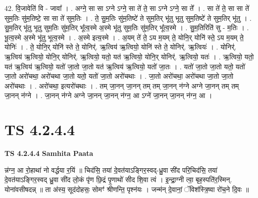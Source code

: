 \documentclass[17pt]{extarticle}
\begin{document}
42. वि॒जावेति॑ वि - जावा᳚ । . अग्ने॒ सा सा ऽग्ने ऽग्ने॒ सा ते॑ ते॒ सा ऽग्ने ऽग्ने॒ सा ते᳚ । . सा ते॑ ते॒ सा सा ते॑ सुम॒तिः सु॑म॒तिष्टे॒ सा सा ते॑ सुम॒तिः । . ते॒ सु॒म॒तिः सु॑म॒तिष्टे॑ ते सुम॒तिर् भू॑तु भूतु सुम॒तिष्टे॑ ते सुम॒तिर् भू॑तु । . सु॒म॒तिर् भू॑तु भूतु सुम॒तिः सु॑म॒तिर् भू᳚त्व॒स्मे अ॒स्मे भू॑तु सुम॒तिः सु॑म॒तिर् भू᳚त्व॒स्मे । . सु॒म॒तिरिति॑ सु - म॒तिः । . भू॒त्व॒स्मे अ॒स्मे भू॑तु भूत्व॒स्मे । . अ॒स्मे इत्य॒स्मे । . अ॒यम् ते॑ ते॒ ऽय म॒यम् ते॒ योनि॒र् योनि॑ स्ते॒ ऽय म॒यम् ते॒ योनिः॑ । . ते॒ योनि॒र् योनि॑ स्ते ते॒ योनिर्॑. ऋ॒त्विय॑ ऋ॒त्वियो॒ योनि॑ स्ते ते॒ योनिर्॑. ऋ॒त्वियः॑ । . योनिर्॑. ऋ॒त्विय॑ ऋ॒त्वियो॒ योनि॒र् योनिर्॑. ऋ॒त्वियो॒ यतो॒ यत॑ ऋ॒त्वियो॒ योनि॒र् योनिर्॑. ऋ॒त्वियो॒ यतः॑ । . ऋ॒त्वियो॒ यतो॒ यत॑ ऋ॒त्विय॑ ऋ॒त्वियो॒ यतो॑ जा॒तो जा॒तो यत॑ ऋ॒त्विय॑ ऋ॒त्वियो॒ यतो॑ जा॒तः । . यतो॑ जा॒तो जा॒तो यतो॒ यतो॑ जा॒तो अरो॑चथा॒ अरो॑चथा जा॒तो यतो॒ यतो॑ जा॒तो अरो॑चथाः । . जा॒तो अरो॑चथा॒ अरो॑चथा जा॒तो जा॒तो अरो॑चथाः । . अरो॑चथा॒ इत्यरो॑चथाः । . तम् जा॒नन् जा॒नन् तम् तम् जा॒नन् न॑ग्ने अग्ने जा॒नन् तम् तम् जा॒नन् न॑ग्ने । . जा॒नन् न॑ग्ने अग्ने जा॒नन् जा॒नन् न॑ग्न॒ आ ऽग्ने॑ जा॒नन् जा॒नन् न॑ग्न॒ आ । \newline
\pagebreak
{}

\section{ TS 4.2.4.4 }

\textbf{TS 4.2.4.4 } \newline
\textbf{Samhita Paata} \newline

न्न॑ग्न॒ आ रो॒हाथा॑ नो वर्द्धया र॒यिं ॥ चिद॑सि॒ तया॑ दे॒वत॑याऽङ्गिर॒स्वद्-ध्रु॒वा सी॑द परि॒चिद॑सि॒ तया॑ दे॒वत॑याऽङ्गिर॒स्वद् ध्रु॒वा सी॑द लो॒कं पृ॑ण छि॒द्रं पृ॒णाथो॑ सीद शि॒वा त्वं । इ॒न्द्रा॒ग्नी त्वा॒ बृह॒स्पति॑र॒स्मिन्. योना॑वसीषदन्न् ॥ ता अ॑स्य॒ सूद॑दोहसः॒ सोमꣳ॑ श्रीणन्ति॒ पृश्न॑यः । जन्म॑न् दे॒वानां॒ ॅविश॑स्त्रि॒ष्वा रो॑च॒ने दि॒वः ॥ \newline
\end{document}
